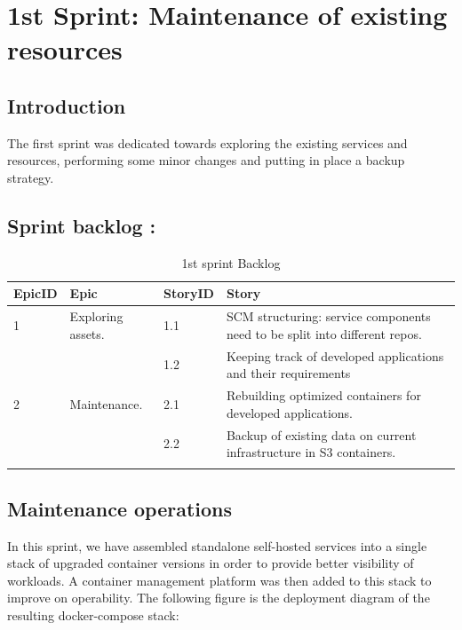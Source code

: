 \graphicspath{{./assets/}}
\setcounter{mtc}{3}
\chapter{1st Sprint: Maintenance of existing resources  }
\minitoc
\newpage


\section*{Introduction}
The first sprint was dedicated towards exploring the existing services and resources, performing some minor changes and putting in place a backup strategy.

\section{Sprint backlog :}

\begin{longtable}[H]{|m{1.5cm}|m{3cm}|m{1.5cm}|m{8cm}|}
\hline
{\textbf{EpicID}} & {\textbf{Epic}} & {\textbf{StoryID}} & {\textbf{Story}} \\
\hline
1 &  \raggedright Exploring assets.	& 1.1  & SCM structuring: service components need to be split into different repos. \\
\cline{3-4}
& & 1.2 &  	Keeping track of developed applications and their requirements \\
\hline
2  & Maintenance. &	2.1	 &  Rebuilding optimized containers for developed applications. \\
\cline{3-4}
& & 2.2 & Backup of existing data on current infrastructure in S3 containers.\\
\hline
\caption{1st sprint Backlog}
\end{longtable}

\section{Maintenance operations}

In this sprint, we have assembled standalone self-hosted services into a single stack of upgraded container versions in order to provide better visibility of workloads. A container management platform was then added to this stack to improve on operability. 
The following figure is the deployment diagram of the resulting docker-compose stack:

